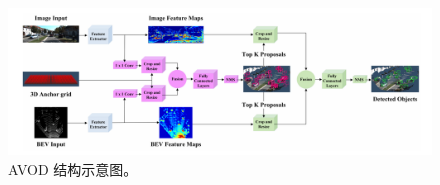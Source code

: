 \begin{figure}[!t]
	\centering
	\includegraphics[width=\textwidth]{./imgs/avod.png}
	\caption{AVOD 结构示意图\cite{ku2018joint}。}
	\label{fig:avod}
\end{figure}
